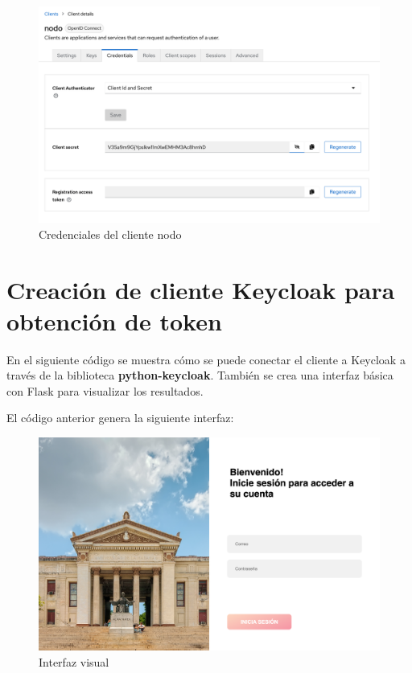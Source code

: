 \begin{figure}[H]
	\centering
	\includegraphics[width=0.9\linewidth]{Graphics/client_nodo_credentials}
	\caption{Credenciales del cliente nodo}
	\label{fig:clientnodocredentials}
\end{figure}


\section{Creación de cliente Keycloak para obtención de token}

En el siguiente código se muestra cómo se puede conectar el cliente a Keycloak a través de la biblioteca \textbf{python-keycloak}. También se crea una interfaz básica con Flask para visualizar los resultados.




El código anterior genera la siguiente interfaz:

\begin{figure}[H]
	\centering
	\includegraphics[width=1\linewidth]{Graphics/interfaz}
	\caption{Interfaz visual}
	\label{fig:interfaz}
\end{figure}

